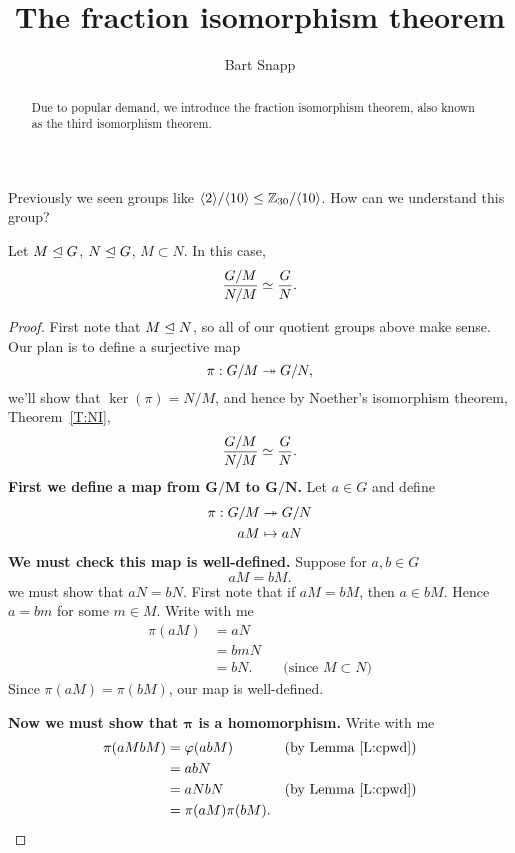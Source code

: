 \documentclass{ximera}
\author{Bart Snapp}
\title{The fraction isomorphism theorem}
\begin{document}
\begin{abstract}
  Due to popular demand, we introduce the fraction isomorphism
  theorem, also known as the third isomorphism theorem.
\end{abstract}
\maketitle


Previously we seen groups like $\<2\>/\<10\>\subgp
\Z_{30}/\<10\>$. How can we understand this group?




\begin{theorem}
  Let $M\normal G$, $N\normal G$, $M\subset N$. In this case,
  \[
  \frac{G/M}{N/M} \iso \frac{G}{N}.
  \]
  \begin{proof}
    First note that $M\normal N$, so all of our quotient groups above
    make sense. Our plan is to define a surjective map
    \[
    \pi:G/M \onto G/N,
    \]
    we'll show that $\ker(\pi) = N/M$, and hence by Noether's
    isomorphism theorem, Theorem~\ref{T:NI},
    \[
    \frac{G/M}{N/M} \iso \frac{G}{N}.
    \]
    \textbf{First we define a map from $\boldsymbol{G/M}$ to
      $\boldsymbol{G/N}$.} Let $a\in G$ and define
    \begin{align*}
      \pi: G/M &\onto G/N \\
      aM &\mapsto aN
    \end{align*}
    \textbf{We must check this map is
      well-defined.} Suppose for $a,b\in G$
    \[
    a M = bM.
    \]
    we must show that $aN = bN$. First note that if $aM = bM$, then $a
    \in bM$. Hence $a=bm$ for some $m\in M$. Write with me
    \begin{align*}
      \pi(aM) &= aN\\
      &= bm N\\
      &= bN.  & &\text{(since $M\subset N$)}
    \end{align*}
    Since $\pi(a M) = \pi(bM)$, our map is well-defined.

    \textbf{Now we must show that $\boldsymbol\pi$ is a homomorphism.}
    Write with me
    \begin{align*}
      \pi(aMbM) &= \phi(ab M) & &\text{(by  Lemma~\ref{L:cpwd})} \\
      &= ab N \\
      &= aN bN & &\text{(by  Lemma~\ref{L:cpwd})} \\
      &= \pi(aM)\pi(bM).
    \end{align*}



\end{proof}
\end{theorem}
\end{document}
